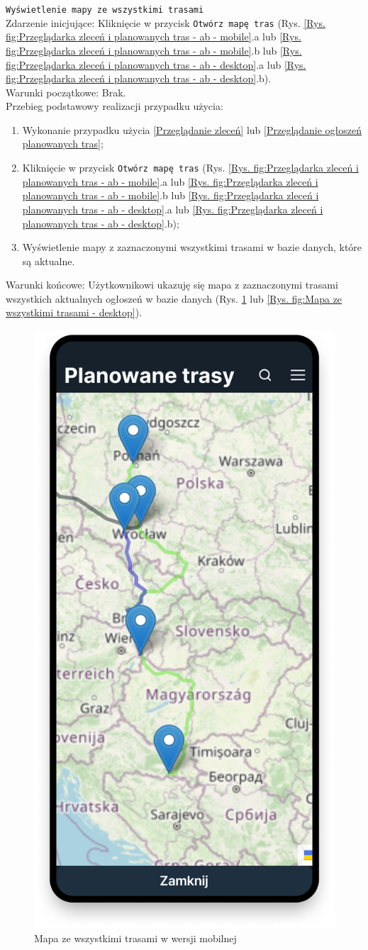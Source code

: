 \texttt{Wyświetlenie mapy ze wszystkimi trasami} \\
Zdarzenie inicjujące: Kliknięcie w przycisk \texttt{Otwórz mapę tras} (Rys. \ref{Rys. fig:Przeglądarka zleceń i planowanych tras - ab - mobile}.a lub \ref{Rys. fig:Przeglądarka zleceń i planowanych tras - ab - mobile}.b lub \ref{Rys. fig:Przeglądarka zleceń i planowanych tras - ab - desktop}.a lub \ref{Rys. fig:Przeglądarka zleceń i planowanych tras - ab - desktop}.b). \\
Warunki początkowe: Brak. \\
Przebieg podstawowy realizacji przypadku użycia:
\begin{enumerate}
    \item Wykonanie przypadku użycia \ref{Przeglądanie zleceń} lub \ref{Przeglądanie ogłoszeń planowanych tras};
    \item Kliknięcie w przycisk \texttt{Otwórz mapę tras} (Rys. \ref{Rys. fig:Przeglądarka zleceń i planowanych tras - ab - mobile}.a lub \ref{Rys. fig:Przeglądarka zleceń i planowanych tras - ab - mobile}.b lub \ref{Rys. fig:Przeglądarka zleceń i planowanych tras - ab - desktop}.a lub \ref{Rys. fig:Przeglądarka zleceń i planowanych tras - ab - desktop}.b);
    \item Wyświetlenie mapy z zaznaczonymi wszystkimi trasami w bazie danych, które są aktualne.
\end{enumerate}
Warunki końcowe: Użytkownikowi ukazuję się mapa z zaznaczonymi trasami wszystkich aktualnych ogłoszeń w bazie danych (Rys. \ref{Rys. fig:Mapa ze wszystkimi trasami - mobile} lub \ref{Rys. fig:Mapa ze wszystkimi trasami - desktop}).\\
\begin{figure}[H]
	\centering
		\includegraphics[width=0.3\linewidth]{rozdzial1/mapa_m.png}
	\caption{Mapa ze wszystkimi trasami w wersji mobilnej}
	\label{Rys. fig:Mapa ze wszystkimi trasami - mobile}
\end{figure}
